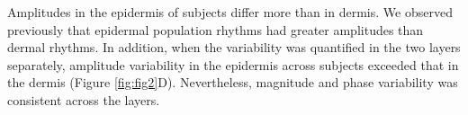 Amplitudes in the epidermis of subjects differ more than in dermis. We observed previously that epidermal population rhythms had greater amplitudes than dermal rhythms. In addition, when the variability was quantified in the two layers separately, amplitude variability in the epidermis across subjects exceeded that in the dermis (Figure \ref{fig:fig2}D). Nevertheless, magnitude and phase variability was consistent across the layers. 


